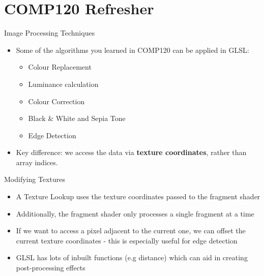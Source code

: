 \part{COMP120 Refresher}
\frame{\partpage}

\begin{frame}{Image Processing Techniques}
	\begin{itemize}
		\item\pause Some of the algorithms you learned in COMP120 can be applied in GLSL:
		\begin{itemize}
			\item Colour Replacement
			\item Luminance calculation  
			\item Colour Correction
			\item Black \& White and Sepia Tone
			\item Edge Detection
		\end{itemize}
		\pause\item Key difference: we access the data via \textbf{texture coordinates}, rather than array indices.
	\end{itemize}
\end{frame}

\begin{frame}{Modifying Textures}
	\begin{itemize}
		\item\pause A Texture Lookup uses the texture coordinates passed to the fragment shader
		\item\pause Additionally, the fragment shader only processes a single fragment at a time
		\item\pause If we want to access a pixel adjacent to the current one, we can offset the current texture coordinates - this is especially useful for edge detection
		\item\pause GLSL has lots of inbuilt functions (e.g distance) which can aid in creating post-processing effects
	\end{itemize}
\end{frame}
